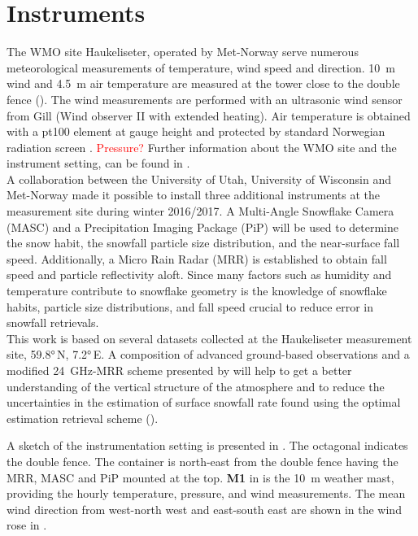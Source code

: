 \section{Instruments} \label{sec:DIM}
The WMO site Haukeliseter, operated by Met-Norway serve numerous meteorological measurements of temperature, wind speed and direction. \SI{10}{\meter} wind and \SI{4.5}{\metre} air temperature are measured at the tower close to the double fence (). The wind measurements are performed with an ultrasonic wind sensor from Gill (Wind observer II with extended heating). Air temperature is obtained with a pt100 element at gauge height and protected by standard Norwegian radiation screen \citep{wolff_derivation_2015}. \textcolor{red}{Pressure? } Further information about the WMO site and the instrument setting, can be found in \citet{wolff_measurements_2013,wolff_derivation_2015}.
\\
A collaboration between the University of Utah, University of Wisconsin and Met-Norway made it possible to install three additional instruments at the measurement site during winter 2016/2017. A Multi-Angle Snowflake Camera (MASC) and a Precipitation Imaging Package (PiP) will be used to determine the snow habit, the snowfall particle size distribution, and the near-surface fall speed. Additionally, a Micro Rain Radar (MRR) is established to obtain fall speed and particle reflectivity aloft. 
Since many factors such as humidity and temperature contribute to snowflake geometry is the knowledge of snowflake habits, particle size distributions, and fall speed crucial to reduce error in snowfall retrievals.
\\
This work is based on several datasets collected at the Haukeliseter measurement site, \ang{59.8}\,N, \ang{7.2}\,E. A composition of advanced ground-based observations and a modified \SI{24}{\giga\Hz}-MRR scheme presented by \citet{cooper_variational_2017} will help to get a better understanding of the vertical structure of the atmosphere and to reduce the uncertainties in the estimation of surface snowfall rate found using the optimal estimation retrieval scheme (). 

\noindent
A sketch of the instrumentation setting is presented in . The octagonal indicates the double fence. The container is north-east from the double fence having the MRR, MASC and PiP mounted at the top. \textbf{M1} in  is the \SI{10}{\metre} weather mast, providing the hourly \citet{eklima_norwegian_2016} temperature, pressure, and wind measurements. The mean wind direction from west-north west and east-south east are shown in the wind rose in .
%
%
